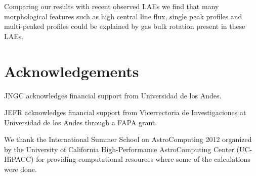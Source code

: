 \documentclass{emulateapj}
\begin{document}
Comparing our results with recent observed LAEs we find that many 
morphological features such as high central line flux, single peak
profiles and multi-peaked profiles could be explained by gas bulk 
rotation present in these LAEs.


\section*{Acknowledgements}

JNGC acknowledges financial support from Universidad de los
Andes. 

JEFR acknowledges financial support from Vicerrectoria de
Investigaciones at Universidad de los Andes through a FAPA grant.

We thank the International Summer School on AstroComputing
2012 organized by the University of California High-Performance
AstroComputing Center (UC-HiPACC) for providing computational
resources where some of the calculations were done. 





 
\end{document}
